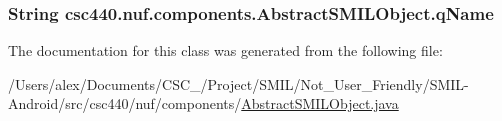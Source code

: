 \hypertarget{classcsc440_1_1nuf_1_1components_1_1_abstract_s_m_i_l_object_a6f53b3bd6f031aea98d92c84ddd8c8db}{
\subsubsection[{q\-Name}]{\setlength{\rightskip}{0pt plus 5cm}String {\bf csc440.\-nuf.\-components.\-Abstract\-S\-M\-I\-L\-Object.\-q\-Name}}}\label{classcsc440_1_1nuf_1_1components_1_1_abstract_s_m_i_l_object_a6f53b3bd6f031aea98d92c84ddd8c8db}


The documentation for this class was generated from the following file\-:\begin{DoxyCompactItemize}
\item 
/\-Users/alex/\-Documents/\-C\-S\-C\-\_/\-Project/\-S\-M\-I\-L/\-Not\-\_\-\-User\-\_\-\-Friendly/\-S\-M\-I\-L-\/\-Android/src/csc440/nuf/components/\hyperlink{_abstract_s_m_i_l_object_8java}{Abstract\-S\-M\-I\-L\-Object.\-java}\end{DoxyCompactItemize}
